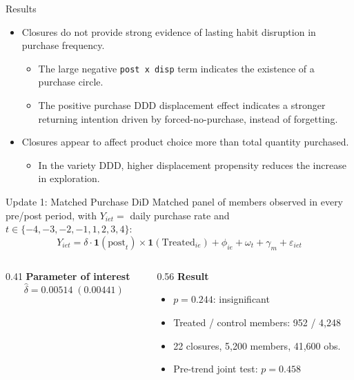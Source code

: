 \documentclass[aspectratio=169]{beamer}  %
\begin{document}
\begin{frame}{Results}
\small
\begin{itemize}
    \item Closures do not provide strong evidence of lasting habit disruption in purchase frequency.
    \begin{itemize}
        \item The large negative \texttt{post x disp} term indicates the existence of a purchase circle.
        \item The positive purchase DDD displacement effect indicates a stronger returning intention driven by forced-no-purchase, instead of forgetting.
    \end{itemize}    
    \item Closures appear to affect product choice more than total quantity purchased.
    \begin{itemize}
        \item In the variety DDD, higher displacement propensity reduces the increase in exploration.
    \end{itemize}
\end{itemize}
\end{frame}

\begin{frame}{Update 1: Matched Purchase DiD}
Matched panel of members observed in every pre/post period, with
$Y_{iet}=$ daily purchase rate and $t \in \{-4,-3,-2,-1,1,2,3,4\}$:
\begingroup
\small
\[
Y_{iet} =
\delta \cdot \mathbf{1}(\text{post}_{t}) \times \mathbf{1}(\text{Treated}_{ie})
+ \phi_{ie} + \omega_t + \gamma_m + \varepsilon_{iet}
\]
\endgroup

\begin{columns}[T]
\begin{column}{0.41\linewidth}
\textbf{Parameter of interest}
\[
\hat{\delta} = 0.00514 \; (0.00441)
\]
\end{column}
\begin{column}{0.56\linewidth}
\textbf{Result}
\begin{itemize}
    \item $p=0.244$: insignificant
    \item Treated / control members: 952 / 4,248
    \item 22 closures, 5,200 members, 41,600 obs.
    \item Pre-trend joint test: $p=0.458$
\end{itemize}
\end{column}
\end{columns}
\end{frame}
\end{document}
